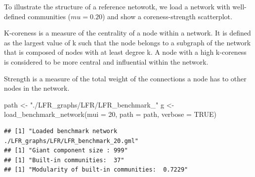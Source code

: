 \documentclass[
]{article}
\newenvironment{Shaded}{\begin{snugshade}}{\end{snugshade}}
\newcommand{\AttributeTok}[1]{\textcolor[rgb]{0.77,0.63,0.00}{#1}}
\newcommand{\ConstantTok}[1]{\textcolor[rgb]{0.00,0.00,0.00}{#1}}
\newcommand{\DecValTok}[1]{\textcolor[rgb]{0.00,0.00,0.81}{#1}}
\newcommand{\FunctionTok}[1]{\textcolor[rgb]{0.00,0.00,0.00}{#1}}
\newcommand{\NormalTok}[1]{#1}
\newcommand{\OtherTok}[1]{\textcolor[rgb]{0.56,0.35,0.01}{#1}}
\newcommand{\SpecialCharTok}[1]{\textcolor[rgb]{0.00,0.00,0.00}{#1}}
\newcommand{\StringTok}[1]{\textcolor[rgb]{0.31,0.60,0.02}{#1}}
\begin{document}
To illustrate the structure of a reference netowotk, we load a network
with well-defined communities (\(mu = 0.20\)) and show a
coreness-strength scatterplot.

K-coreness is a measure of the centrality of a node within a network. It
is defined as the largest value of k such that the node belongs to a
subgraph of the network that is composed of nodes with at least degree
k. A node with a high k-coreness is considered to be more central and
influential within the network.

Strength is a measure of the total weight of the connections a node has
to other nodes in the network.

\begin{Shaded}
\begin{Highlighting}[]
\NormalTok{path }\OtherTok{\textless{}{-}} \StringTok{"./LFR\_graphs/LFR/LFR\_benchmark\_"}
\NormalTok{g }\OtherTok{\textless{}{-}} \FunctionTok{load\_benchmark\_network}\NormalTok{(}\AttributeTok{mui =} \DecValTok{20}\NormalTok{, }\AttributeTok{path =}\NormalTok{ path, }\AttributeTok{verbose =} \ConstantTok{TRUE}\NormalTok{)}
\end{Highlighting}
\end{Shaded}

\begin{verbatim}
## [1] "Loaded benchmark network ./LFR_graphs/LFR/LFR_benchmark_20.gml"
## [1] "Giant component size : 999"
## [1] "Built-in communities:  37"
## [1] "Modularity of built-in communities:  0.7229"
\end{verbatim}

\begin{Shaded}
\end{Shaded}
\end{document}
